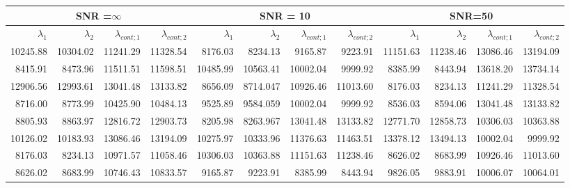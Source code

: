 

\begin{table*}
\begin{center}
\begin{tabular}{rrrr | rrrr | rrrr}
  \hline
 \multicolumn{4}{c}{SNR =$ \infty$ } & \multicolumn{4}{c}{SNR = 10} &  \multicolumn{4}{c}{SNR=50} \\
  \hline
$\lambda_1$ & $\lambda_2$ & $\lambda_{cont;1}$ & $\lambda_{cont;2} $ & $\lambda_1$ & $\lambda_2$ & $\lambda_{cont;1}$ & $\lambda_{cont;2} $ & $\lambda_1$ & $\lambda_2$ & $\lambda_{cont;1}$ & $\lambda_{cont;2} $ \\ 
  \hline
     10245.88 & 10304.02 &	11241.29 & 11328.54 & 8176.03  & 8234.13  &	9165.87  & 9223.91  &  11151.63 & 11238.46 &      13086.46 & 13194.09 \\
     8415.91  & 8473.96  &	11511.51 & 11598.51 & 10485.99 & 10563.41 &	10002.04 & 9999.92  &  8385.99  & 8443.94  &      13618.20 & 13734.14 \\
     12906.56 & 12993.61 &	13041.48 & 13133.82 & 8656.09  & 8714.047 &      10926.46 & 11013.60 &  8176.03  & 8234.13  &      11241.29 & 11328.54 \\
     8716.00  & 8773.99  &	10425.90 & 10484.13 & 9525.89  & 9584.059 &	10002.04 & 9999.92  &  8536.03  & 8594.06  &      13041.48 & 13133.82 \\ 
     8805.93  & 8863.97  &	12816.72 & 12903.73 & 8205.98  & 8263.967 &	13041.48 & 13133.82 &  12771.70 & 12858.73 &      10306.03 & 10363.88 \\
     10126.02 & 10183.93 &	13086.46 & 13194.09 & 10275.97 & 10333.96 &	11376.63 & 11463.51 &  13378.12 & 13494.13 &      10002.04 & 9999.92  \\
     8176.03  & 8234.13  &	10971.57 & 11058.46 & 10306.03 & 10363.88 &	11151.63 & 11238.46 &  8626.02  & 8683.99  &      10926.46 & 11013.60 \\
     8626.02  & 8683.99  &	10746.43 & 10833.57 & 9165.87  & 9223.91  &	8385.99  & 8443.94  &  9826.05  & 9883.91  &      10006.07 & 10064.01 \\

\end{tabular}
\end{center}
\end{table*}

